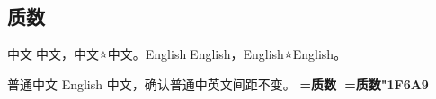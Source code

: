 \documentclass{article}
\begin{document}
\subsection{质数🚩}
中文🚩中文，中文⭐中文。English🚩English，English⭐English。

普通中文 English 中文，确认普通中英文间距不变。
\begingroup
\fontsize{15.75bp}{21bp}\selectfont\bfseries
{}=\hbox{质数🚩}
=\hbox{质数{\PortraitSymbolFont\char"1F6A9}}
\ifdim\wd0<\wd1\else\errmessage{Emoji spacing did not shrink}\fi
\endgroup
\end{document}
